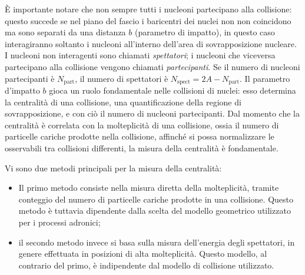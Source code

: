 È importante notare che non sempre tutti i nucleoni partecipano alla collisione: questo succede se nel piano del fascio i baricentri dei nuclei non non coincidono ma sono separati da una distanza $b$ (parametro di impatto), in questo caso interagiranno soltanto i nucleoni all'interno dell'area di sovrapposizione nucleare. 
I nucleoni non interagenti sono chiamati \emph{spettatori}; i nucleoni che viceversa partecipano alla collisione vengono chiamati \emph{partecipanti}.
Se il numero di nucleoni partecipanti è $N_\text{part}$, il numero di spettatori è $N_\text{spect} = 2A-N_\text{part}$.
Il parametro d'impatto $b$ gioca un ruolo fondamentale nelle collisioni di nuclei: esso determina la centralità di una collisione, una quantificazione della regione di sovrapposizione, e con ciò il numero di nucleoni partecipanti.
Dal momento che la centralità è correlata con la molteplicità di una collisione, ossia il numero di particelle cariche prodotte nella collisione, affinché si possa normalizzare le osservabili tra collisioni differenti, la misura della centralità è fondamentale.

Vi sono due metodi principali per la misura della centralità:
\begin{itemize}
    \item Il primo metodo consiste nella misura diretta della molteplicità, tramite conteggio del numero di particelle cariche prodotte in una collisione.
    Questo metodo è tuttavia dipendente dalla scelta del modello geometrico utilizzato per i processi adronici;
    \item il secondo metodo invece si basa sulla misura dell'energia degli spettatori, in genere effettuata in posizioni di alta molteplicità.
    Questo modello, al contrario del primo, è indipendente dal modello di collisione utilizzato.
\end{itemize}

